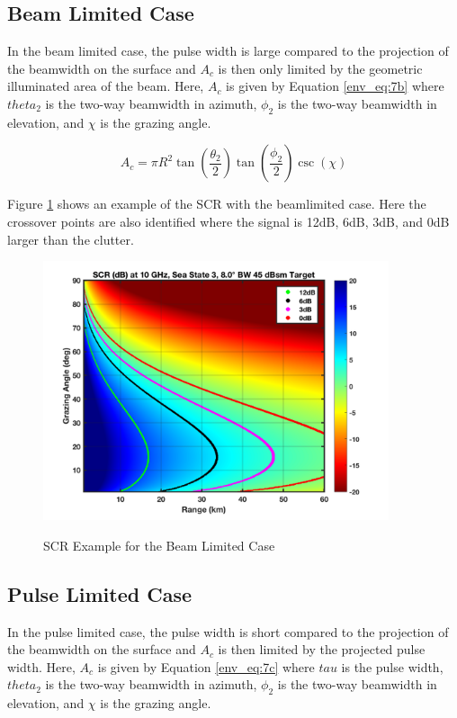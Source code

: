 \subsection{Beam Limited Case}
In the beam limited case, the pulse width is large compared to the projection of the beamwidth on the surface and $A_c$ is then only limited by the geometric illuminated area of the beam. Here, $A_c$ is given by Equation \ref{env_eq:7b} where $theta_2$ is the two-way beamwidth in azimuth, $\phi_2$ is the two-way beamwidth in elevation, and $\chi$ is the grazing angle.

\begin{equation}
\label{env_eq:7b}
A_c = \pi R^2\tan\left(\frac{\theta_2}{2}\right)\tan\left(\frac{\phi_2}{2}\right)\csc(\chi)
\end{equation}

Figure \ref{env_fig:3z} shows an example of the SCR with the beamlimited case. Here the crossover points are also identified where the signal is 12dB, 6dB, 3dB, and 0dB larger than the clutter.
\begin{figure}[H]
  \begin{center}
\includegraphics[width=4in]{../media/multistatic/scr.png}
  \end{center}
  \renewcommand{\baselinestretch}{1} \small\normalsize
  \begin{quote}
    \caption[SCR Example for the Beam Limited Case]{SCR Example for the Beam Limited Case\label{env_fig:3z}}
  \end{quote}
\end{figure}
\renewcommand{\baselinestretch}{2} \small\normalsize

\subsection{Pulse Limited Case}
In the pulse limited case, the pulse width is short compared to the projection of the beamwidth on the surface and $A_c$ is then limited by the projected pulse width. Here, $A_c$ is given by Equation \ref{env_eq:7c} where $tau$ is the pulse width, $theta_2$ is the two-way beamwidth in azimuth, $\phi_2$ is the two-way beamwidth in elevation, and $\chi$ is the grazing angle.

